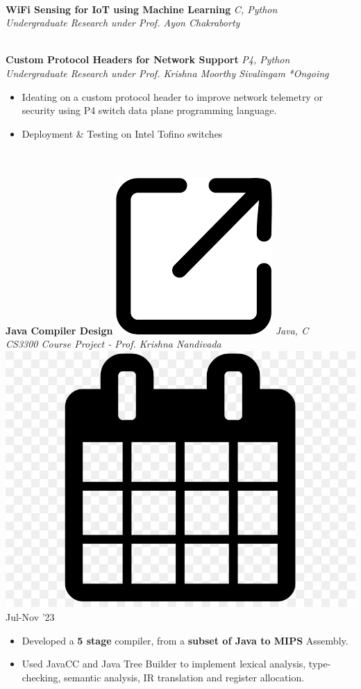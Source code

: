 \documentclass[article]{article}
\newcommand{\myMargin}{0.15in}
\newcommand{\resheading}[1]{{\small \colorbox{myblue} { \begin{minipage}{\dimexpr\linewidth-2\fboxsep}\centering{\textbf{#1 \vphantom{p\^{E}}}}\end{minipage}}}}
\newcommand{\myfont}[2]{\fontsize{#1}{#1}\selectfont #2}
\newcommand{\subheadingfont}[1]{\myfont{10pt}{#1}}
\newcommand{\projecttopic}[1]{\myfont{10pt}{\textbf{#1}}}
\newcommand{\projectdesc}[1]{\myfont{9pt}{\textcolor{projDescColor}{\textit{#1}}}}
\newcommand{\mylink}[1]{\href{#1}{\includegraphics[scale=0.03]{download.png}}}
\newcommand{\mycal}[1]{\includegraphics[scale=0.018]{calendar.png} \myfont{9}{#1}}
\begin{document}
\begin{multicols*}{2}
\noindent
\hrulefill \\ [-0.45cm]
\projecttopic{WiFi Sensing for IoT using Machine Learning} \hfill \textcolor{projDescColor}{\textit{C, Python}} \\ [0.1cm]
\projectdesc{Undergraduate Research under Prof. Ayon Chakraborty}
\vspace{3pt} 
\noindent
\hrulefill \\ [-0.45cm]
\projecttopic{Custom Protocol Headers for Network Support}   \hfill \textcolor{projDescColor}{\textit{P4, Python}}\\[0.1cm]
\projectdesc{Undergraduate Research under Prof. Krishna Moorthy Sivalingam} \hfill \textit{*Ongoing}
\vspace{1pt}
\begin{itemize}[leftmargin=\myMargin]
    \setlength \itemsep{-0.1em}
    \item Ideating on a custom protocol header to improve network telemetry or security using P4 switch data plane programming language.
    \item Deployment \& Testing on Intel Tofino switches  
\end{itemize}
\vspace{3pt}

\noindent
\resheading{\subheadingfont{PROJECTS} }\\[0.1cm]

\noindent
\hrulefill \\ [-0.45cm]
\projecttopic{Java Compiler Design}
\mylink{https://github.com/Snehadeep-Gayen/Compiler-Design-HW}
\hfill    \textcolor{projDescColor}{\textit{Java, C}}  \\[0.05cm]
\projectdesc{CS3300 Course Project - Prof. Krishna Nandivada} \hfill \mycal{Jul-Nov '23} \\
\noindent
\vspace{-0.4cm}
\begin{itemize}[leftmargin=\myMargin]
    \item Developed a \textbf{5 stage} compiler, from a \textbf{subset of Java to MIPS} Assembly.
    \item Used JavaCC and Java Tree Builder to implement lexical analysis, type-checking, semantic analysis, IR translation and register allocation.
\end{itemize}
\vspace{5pt}


\end{multicols*}
\end{document}
